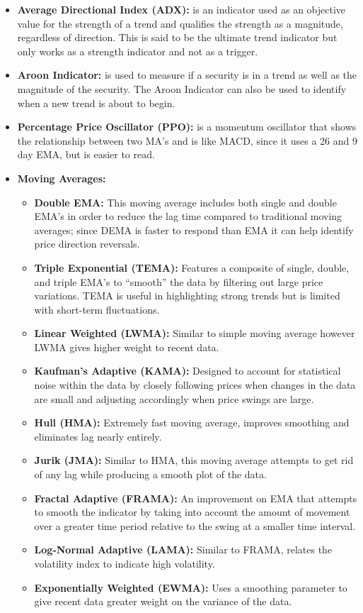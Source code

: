 \documentclass[11pt]{article}
\begin{document}
\begin{itemize}
\item \textbf{Average Directional Index (ADX):} is an indicator used as an objective value for the strength of a trend and qualifies the strength as a magnitude, regardless of direction. This is said to be the ultimate trend indicator but only works as a strength indicator and not as a trigger.
\item \textbf{Aroon Indicator:} is used to measure if a security is in a trend as well as the magnitude of the security. The Aroon Indicator can also be used to identify when a new trend is about to begin.
\item \textbf{Percentage Price Oscillator (PPO):} is a momentum oscillator that shows the relationship between two MA’s and is like MACD, since it uses a 26 and 9 day EMA, but is easier to read.
\item \textbf{Moving Averages:}
	\begin{itemize}
		\item \textbf{Double EMA:} This moving average includes both single and double EMA’s in order to reduce the lag time compared to traditional moving averages; since DEMA is faster to respond than EMA it can help identify price direction reversals.
		\item \textbf{Triple Exponential (TEMA):} Features a composite of single, double, and triple EMA’s to “smooth” the data by filtering out large price variations. TEMA is useful in highlighting strong trends but is limited with short-term fluctuations.
		\item \textbf{Linear Weighted (LWMA):} Similar to simple moving average however LWMA gives higher weight to recent data.
		\item \textbf{Kaufman’s Adaptive (KAMA):} Designed to account for statistical noise within the data by closely following prices when changes in the data are small and adjusting accordingly when price swings are large.
		\item \textbf{Hull (HMA):} Extremely fast moving average, improves smoothing and eliminates lag nearly entirely.
		\item \textbf{Jurik (JMA):} Similar to HMA, this moving average attempts to get rid of any lag while producing a smooth plot of the data.
		\item \textbf{Fractal Adaptive (FRAMA):} An improvement on EMA that attempts to smooth the indicator by taking into account the amount of movement over a greater time period relative to the swing at a smaller time interval.
		\item \textbf{Log-Normal Adaptive (LAMA):} Similar to FRAMA, relates the volatility index to indicate high volatility.
		\item \textbf{Exponentially Weighted (EWMA):} Uses a smoothing parameter to give recent data greater weight on the variance of the data.
	\end{itemize}
\end{itemize}
\end{document}
